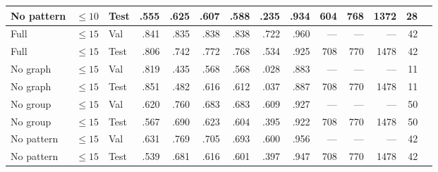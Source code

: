 \documentclass[10pt,a4paper]{article}
\newcommand{\na}{---}
\begin{document}
\begin{landscape}
\begin{center}
{\begin{tabular}{lllrrrrrrrrrrr}
No pattern& $\leq10$ & Test & .555 & .625 & .607 & .588 & .235 & .934 & 604 & 768 & 1372 & 28 \\
\midrule
Full    & $\leq15$ & Val  & .841 & .835 & .838 & .838 & .722 & .960 & \na & \na & \na & 42 \\
Full    & $\leq15$ & Test & .806 & .742 & .772 & .768 & .534 & .925 & 708 & 770 & 1478 & 42 \\
No graph& $\leq15$ & Val  & .819 & .435 & .568 & .568 & .028 & .883 & \na & \na & \na & 11 \\
No graph& $\leq15$ & Test & .851 & .482 & .616 & .612 & .037 & .887 & 708 & 770 & 1478 & 11 \\
No group& $\leq15$ & Val  & .620 & .760 & .683 & .683 & .609 & .927 & \na & \na & \na & 50 \\
No group& $\leq15$ & Test & .567 & .690 & .623 & .604 & .395 & .922 & 708 & 770 & 1478 & 50 \\
No pattern& $\leq15$ & Val  & .631 & .769 & .705 & .693 & .600 & .956 & \na & \na & \na & 42 \\
No pattern& $\leq15$ & Test & .539 & .681 & .616 & .601 & .397 & .947 & 708 & 770 & 1478 & 42 \\
\bottomrule
\end{tabular}}
\end{center}
\end{landscape}
\end{document}
